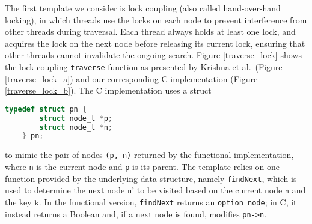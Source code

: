 \documentclass[sigplan,screen]{acmart}
\begin{document}
The first template we consider is lock coupling (also called hand-over-hand locking), in which threads use the locks on each node to prevent interference from other threads during traversal. Each thread always holds at least one lock, and acquires the lock on the next node before releasing its current lock, ensuring that other threads cannot invalidate the ongoing search.
Figure \ref{traverse_lock} shows the lock-coupling \lstinline{traverse} function as presented by Krishna et al.~(Figure \ref{traverse_lock_a}) and our corresponding C implementation (Figure \ref{traverse_lock_b}). The C implementation uses a struct
\begin{lstlisting}[style=myStyle, language = C, backgroundcolor=\color{white}, basicstyle=\ttfamily\footnotesize, numbers=none, xleftmargin=0.5em]
	typedef struct pn {
		struct node_t *p; 
		struct node_t *n;
	} pn;
\end{lstlisting}
to mimic the pair of nodes \lstinline{(p, n)} returned by the functional implementation, where \lstinline{n} is the current node and \lstinline{p} is its parent. The template relies on one function provided by the underlying data structure, namely \lstinline{findNext}, which is used to determine the next node $\texttt{n'}$ to be visited based on the current node $\texttt{n}$ and the key $\texttt{k}$. In the functional version, \lstinline{findNext} returns an \lstinline{option node}; in C, it instead returns a Boolean and, if a next node is found, modifies \lstinline{pn->n}.

\end{document}
